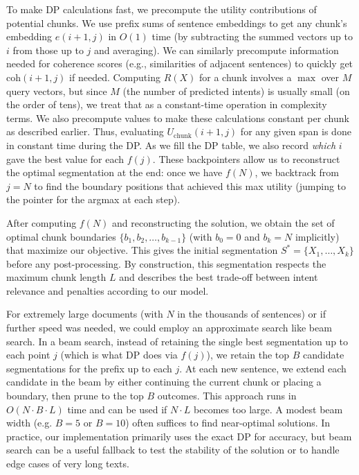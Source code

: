 \documentclass[12pt,a4paper]{report}
\begin{document}
To make DP calculations fast, we precompute the utility contributions of potential chunks. We use prefix sums of sentence embeddings to get any chunk's embedding $e(i+1,j)$ in $O(1)$ time (by subtracting the summed vectors up to $i$ from those up to $j$ and averaging). We can similarly precompute information needed for coherence scores (e.g., similarities of adjacent sentences) to quickly get $\text{coh}(i+1,j)$ if needed. Computing $R(X)$ for a chunk involves a $\max$ over $M$ query vectors, but since $M$ (the number of predicted intents) is usually small (on the order of tens), we treat that as a constant-time operation in complexity terms. We also precompute values to make these calculations constant per chunk as described earlier. Thus, evaluating $U_{\text{chunk}}(i+1,j)$ for any given span is done in constant time during the DP. As we fill the DP table, we also record \emph{which} $i$ gave the best value for each $f(j)$. These backpointers allow us to reconstruct the optimal segmentation at the end: once we have $f(N)$, we backtrack from $j=N$ to find the boundary positions that achieved this max utility (jumping to the pointer for the argmax at each step).

After computing $f(N)$ and reconstructing the solution, we obtain the set of optimal chunk boundaries $\{b_1, b_2, \dots, b_{k-1}\}$ (with $b_0=0$ and $b_k=N$ implicitly) that maximize our objective. This gives the initial segmentation $S^* = \{X_1,\ldots,X_k\}$ before any post-processing. By construction, this segmentation respects the maximum chunk length $L$ and describes the best trade-off between intent relevance and penalties according to our model.

For extremely large documents (with $N$ in the thousands of sentences) or if further speed was needed, we could employ an approximate search like beam search. In a beam search, instead of retaining the single best segmentation up to each point $j$ (which is what DP does via $f(j)$), we retain the top $B$ candidate segmentations for the prefix up to each $j$. At each new sentence, we extend each candidate in the beam by either continuing the current chunk or placing a boundary, then prune to the top $B$ outcomes. This approach runs in $O(N \cdot B \cdot L)$ time and can be used if $N \cdot L$ becomes too large. A modest beam width (e.g. $B=5$ or $B=10$) often suffices to find near-optimal solutions. In practice, our implementation primarily uses the exact DP for accuracy, but beam search can be a useful fallback to test the stability of the solution or to handle edge cases of very long texts.
\end{document}
